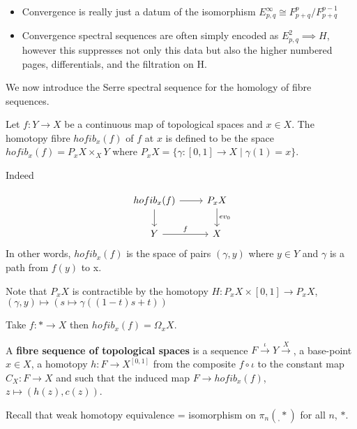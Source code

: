 \documentclass[10pt,a4paper]{article}
\begin{document}
\begin{remark}
\begin{itemize}
\item Convergence is really just a datum of the isomorphism $E^\infty_{p,q} \cong F^p_{p+q}/F^{p-1}_{p+q}$
\item Convergence spectral sequences are often simply encoded as $E^2_{p,q} \implies H$, however this suppresses not only this data but also the higher numbered pages, differentials, and the filtration on H.
\end{itemize}
\end{remark}

We now introduce the Serre spectral sequence for the homology of fibre sequences.

\begin{defn}
Let $f:Y\to X$ be a continuous map of topological spaces and $x\in X$. The homotopy fibre $hofib_x(f)$ of $f$ at $x$ is defined to be the space $hofib_x(f) = P_x X\times_X Y$ where $P_x X = \{\gamma:[0,1]\to X\mid \gamma(1) = x\}$.
\end{defn}

Indeed

\[\begin{tikzcd}
hofib_x(f)\arrow{r}\arrow{d} & P_x X\arrow{d}{ev_0} \\
Y \arrow{r}{f} & X
\end{tikzcd}\]
In other words, $hofib_x(f)$ is the space of pairs $(\gamma,y)$ where $y\in Y$ and $\gamma$ is a path from $f(y)$ to x.
\begin{remark}
Note that $P_x X$ is contractible by the homotopy $H:P_xX\times [0,1]\to P_xX$, $(\gamma,y)\mapsto (s\mapsto \gamma((1-t)s + t))$
\end{remark}

\begin{example}
Take $f:*\to X$ then $hofib_x(f) = \Omega_x X$.
\end{example}

\begin{defn}
A \textbf{fibre sequence of topological spaces} is a sequence $F\xrightarrow{\iota} Y \xrightarrow{X}$, a base-point $x\in X$, a homotopy $h:F\to X^{[0,1]}$ from the composite $f\circ \iota$ to the constant map $C_X:F\to X$ and such that the induced map $F\to hofib_x(f)$, $z\mapsto(h(z),c(z))$.
\end{defn}

\begin{remark}
Recall that weak homotopy equivalence = isomorphism on $\pi_n(_, *)$ for all $n$, $*$.
\end{remark}
\end{document}
